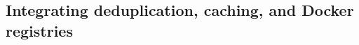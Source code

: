 \subsection{Integrating deduplication, caching, and Docker registries}
\label{sec:design}

%

%
%
%
%

%


